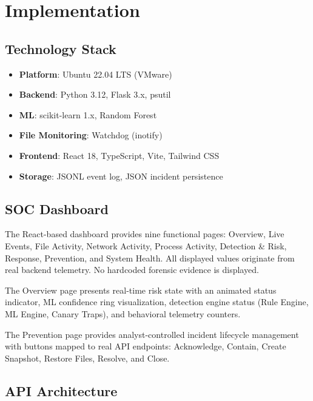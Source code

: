 \documentclass[conference]{IEEEtran}
\begin{document}

\section{Implementation}

\subsection{Technology Stack}

\begin{itemize}
    \item \textbf{Platform}: Ubuntu 22.04 LTS (VMware)
    \item \textbf{Backend}: Python 3.12, Flask 3.x, psutil
    \item \textbf{ML}: scikit-learn 1.x, Random Forest
    \item \textbf{File Monitoring}: Watchdog (inotify)
    \item \textbf{Frontend}: React 18, TypeScript, Vite, Tailwind CSS
    \item \textbf{Storage}: JSONL event log, JSON incident persistence
\end{itemize}

\subsection{SOC Dashboard}

The React-based dashboard provides nine functional pages:
Overview, Live Events, File Activity, Network Activity,
Process Activity, Detection \& Risk, Response, Prevention,
and System Health. All displayed values originate from
real backend telemetry. No hardcoded forensic evidence
is displayed.

The Overview page presents real-time risk state with an
animated status indicator, ML confidence ring visualization,
detection engine status (Rule Engine, ML Engine, Canary Traps),
and behavioral telemetry counters.

The Prevention page provides analyst-controlled incident
lifecycle management with buttons mapped to real API endpoints:
Acknowledge, Contain, Create Snapshot, Restore Files,
Resolve, and Close.

\subsection{API Architecture}
\end{document}
